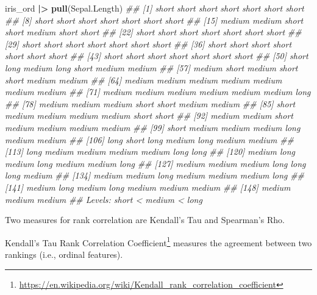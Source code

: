 \documentclass[
  notitlepage]{book}
\newenvironment{Shaded}{\begin{snugshade}}{\end{snugshade}}
\newcommand{\CommentTok}[1]{\textcolor[rgb]{0.56,0.35,0.01}{\textit{#1}}}
\newcommand{\ErrorTok}[1]{\textcolor[rgb]{0.64,0.00,0.00}{\textbf{#1}}}
\newcommand{\KeywordTok}[1]{\textcolor[rgb]{0.13,0.29,0.53}{\textbf{#1}}}
\newcommand{\NormalTok}[1]{#1}
\newcommand{\OperatorTok}[1]{\textcolor[rgb]{0.81,0.36,0.00}{\textbf{#1}}}
\newcommand{\StringTok}[1]{\textcolor[rgb]{0.31,0.60,0.02}{#1}}
\DeclareRobustCommand{\href}[2]{#2\footnote{\url{#1}}}
\begin{document}
\begin{Shaded}
\begin{Highlighting}[]
\NormalTok{iris\_ord }\OperatorTok{|}\ErrorTok{\textgreater{}}\StringTok{ }
\StringTok{  }\KeywordTok{pull}\NormalTok{(Sepal.Length)}
\CommentTok{\#\#   [1] short  short  short  short  short  short  short }
\CommentTok{\#\#   [8] short  short  short  short  short  short  short }
\CommentTok{\#\#  [15] medium medium short  short  medium short  short }
\CommentTok{\#\#  [22] short  short  short  short  short  short  short }
\CommentTok{\#\#  [29] short  short  short  short  short  short  short }
\CommentTok{\#\#  [36] short  short  short  short  short  short  short }
\CommentTok{\#\#  [43] short  short  short  short  short  short  short }
\CommentTok{\#\#  [50] short  long   medium long   short  medium medium}
\CommentTok{\#\#  [57] medium short  medium short  short  medium medium}
\CommentTok{\#\#  [64] medium medium medium medium medium medium medium}
\CommentTok{\#\#  [71] medium medium medium medium medium medium long  }
\CommentTok{\#\#  [78] medium medium medium short  short  medium medium}
\CommentTok{\#\#  [85] short  medium medium medium medium short  short }
\CommentTok{\#\#  [92] medium medium short  medium medium medium medium}
\CommentTok{\#\#  [99] short  medium medium medium long   medium medium}
\CommentTok{\#\# [106] long   short  long   medium long   medium medium}
\CommentTok{\#\# [113] long   medium medium medium medium long   long  }
\CommentTok{\#\# [120] medium long   medium long   medium medium long  }
\CommentTok{\#\# [127] medium medium medium long   long   long   medium}
\CommentTok{\#\# [134] medium medium long   medium medium medium long  }
\CommentTok{\#\# [141] medium long   medium long   medium medium medium}
\CommentTok{\#\# [148] medium medium medium}
\CommentTok{\#\# Levels: short \textless{} medium \textless{} long}
\end{Highlighting}
\end{Shaded}

Two measures for rank correlation are Kendall's Tau and Spearman's Rho.

\href{https://en.wikipedia.org/wiki/Kendall_rank_correlation_coefficient}{Kendall's Tau Rank Correlation
Coefficient}
measures the agreement between two rankings (i.e., ordinal features).
\end{document}
